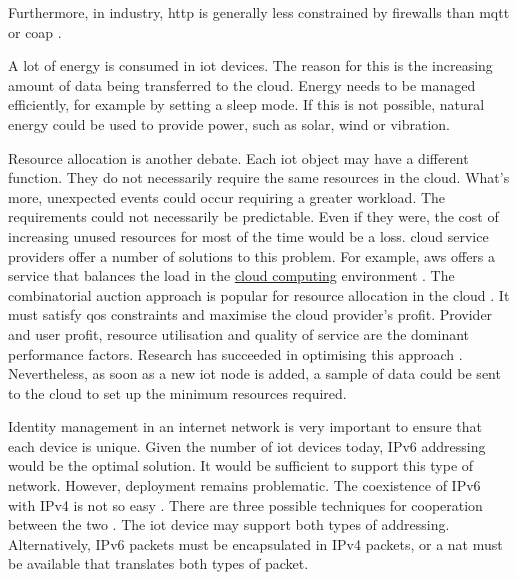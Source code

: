 Furthermore, in industry, \acrshort{http} is generally less constrained by firewalls than \acrshort{mqtt} or \acrshort{coap} \cite{OTA_Solution_proposed}.

A lot of energy is consumed in \acrshort{iot} devices. The reason for this is the increasing amount of data being transferred to the \gls{cloud}. Energy needs to be managed efficiently, for example by setting a sleep mode. If this is not possible, natural energy could be used to provide power, such as solar, wind or vibration. \cite{cloud_of_thing}

Resource allocation is another debate. Each \acrshort{iot} object may have a different function. They do not necessarily require the same resources in the \gls{cloud}. What's more, unexpected events could occur requiring a greater workload. The requirements could not necessarily be predictable. Even if they were, the cost of increasing unused resources for most of the time would be a loss. \Gls{cloud} service providers offer a number of solutions to this problem. For example, \gls{aws} offers a service that balances the load in the \hyperref[subsec:cloudcomputing]{cloud computing} environment \cite{elb_aws}. The combinatorial auction approach is popular for resource allocation in the \gls{cloud} \cite{optimization_resources_allocation}. It must satisfy \acrfull{qos} constraints and maximise the \gls{cloud} provider's profit. Provider and user profit, resource utilisation and quality of service are the dominant performance factors. Research has succeeded in optimising this approach \cite{optimization_resources_allocation}. Nevertheless, as soon as a new \acrshort{iot} node is added, a sample of data could be sent to the \gls{cloud} to set up the minimum resources required. \cite{cloud_of_thing}

Identity management in an internet network is very important to ensure that each device is unique. Given the number of \acrshort{iot} devices today, IPv6 addressing would be the optimal solution. It would be sufficient to support this type of network. However, deployment remains problematic. The coexistence of IPv6 with IPv4 is not so easy \cite{cloud_of_thing}. There are three possible techniques for cooperation between the two \cite{coexistence_ipv4_ipv6}. The \acrshort{iot} device may support both types of addressing. Alternatively, IPv6 packets must be encapsulated in IPv4 packets, or a \acrfull{nat} must be available that translates both types of packet.

